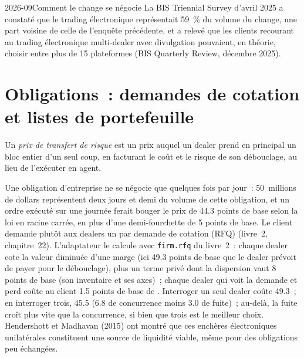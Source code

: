 \begin{dated}{2026-09}{Comment le change se négocie}\label{dat:mx:execution-beyond-equities:bis}
La BIS Triennial Survey d'avril 2025 a constaté que le trading électronique représentait 59~\% du volume du change, une part voisine de celle de l'enquête précédente, et a relevé que
les clients recourant au trading électronique multi-dealer avec divulgation pouvaient, en théorie, choisir entre plus de 15 plateformes (BIS Quarterly Review, décembre 2025).
\end{dated}

\section{Obligations~: demandes de cotation et listes de portefeuille}

\begin{definition}\label{def:mx:execution-beyond-equities:rtp}
Un \emph{prix de transfert de risque} est un prix auquel un dealer prend en principal un bloc entier d'un seul coup, en facturant le coût et
le risque de son débouclage, au lieu de l'exécuter en agent.
\end{definition}

Une obligation d'entreprise ne se négocie que quelques fois par jour~: 50~millions de dollars représentent deux jours et demi du volume de cette obligation, et un ordre exécuté sur une journée ferait bouger le
prix de 44.3 points de base selon la loi en racine carrée, en plus d'une demi-fourchette de 5 points de base. Le client demande plutôt aux dealers un  par
demande de cotation (RFQ) (livre~2, chapitre~22). L'adaptateur le calcule avec \texttt{firm.rfq} du livre~2~: chaque dealer cote la valeur diminuée d'une marge (ici
49.3 points de base que le dealer prévoit de payer pour le débouclage), plus un terme privé dont la dispersion vaut 8 points de base (son inventaire et ses axes)~; chaque dealer qui
voit la demande et perd coûte au client 1.5 points de base de . Interroger un seul dealer coûte 49.3~; en interroger trois, 45.5 (6.8 de concurrence moins 3.0
de fuite)~; au-delà, la fuite croît plus vite que la concurrence, si bien que trois est le meilleur choix. Hendershott et Madhavan (2015) ont montré que ces enchères électroniques unilatérales
constituent une source de liquidité viable, même pour des obligations peu échangées.

